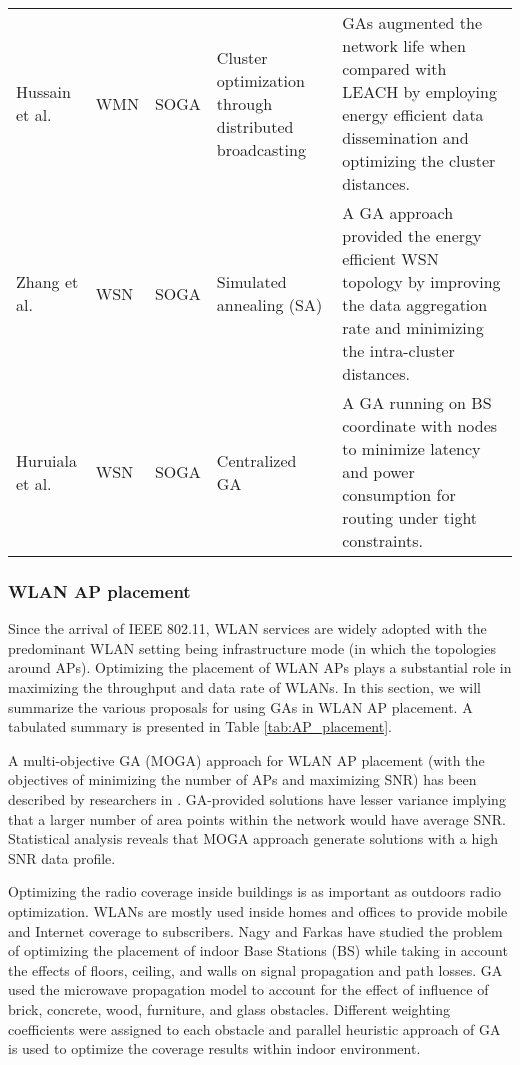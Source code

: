 \documentclass[journal]{IEEEtran}
\begin{document}
\begin{table*}
\begin{tabular}{p{2cm} p{0.8cm} p{1.5cm} p{3.7cm} p{8cm}}
Hussain et al. \cite{hussain2007genetic}   &  WMN  & SOGA & Cluster optimization through distributed broadcasting &  GAs augmented the network life when compared with LEACH \cite{heinzelman2000energy} by employing energy efficient data dissemination and optimizing the cluster distances.\\

Zhang et al. \cite{zhang2008optimal}  &  WSN  & SOGA &  Simulated annealing (SA)\cite{stumpf1994enhanced}  &  A GA approach provided the energy efficient WSN topology by improving the data aggregation rate and minimizing the intra-cluster distances.\\

Huruiala et al. \cite{huruiala2010hierarchical}  &  WSN  & SOGA & Centralized GA &  A GA running on BS coordinate with nodes to minimize latency and power consumption for routing under tight constraints.\\

\bottomrule
\end{tabular}
\label{tab:generalApplications}
\end{table*}

\vspace{2mm}
\subsubsection{WLAN AP placement}
\label{sec:APplacement}

Since the arrival of IEEE 802.11, WLAN services are widely adopted with the predominant WLAN setting being infrastructure mode (in which the topologies around APs). Optimizing the placement of WLAN APs plays a substantial role in maximizing the throughput and data rate of WLANs. In this section, we will summarize the various proposals for using GAs in WLAN AP placement. A tabulated summary is presented in Table \ref{tab:AP_placement}.

A multi-objective GA (MOGA) approach for WLAN AP placement (with the objectives of minimizing the number of APs and maximizing SNR) has been described by researchers in \cite{maksuriwong2003wireless}. GA-provided solutions have lesser variance implying that a larger number of area points within the network would have average SNR. Statistical analysis reveals that MOGA approach generate solutions with a high SNR data profile.

Optimizing the radio coverage inside buildings is as important as outdoors radio optimization. WLANs are mostly used inside homes and offices to provide mobile and Internet coverage to subscribers. Nagy and Farkas \cite{nagy2000indoor} have studied the problem of optimizing the placement of indoor Base Stations (BS) while taking in account the effects of floors, ceiling, and walls on signal propagation and path losses. GA used the microwave propagation model to account for the effect of influence of brick, concrete, wood, furniture, and glass obstacles. Different weighting coefficients were assigned to each obstacle and parallel heuristic approach of GA is used to optimize the coverage results within indoor environment.
\end{document}
